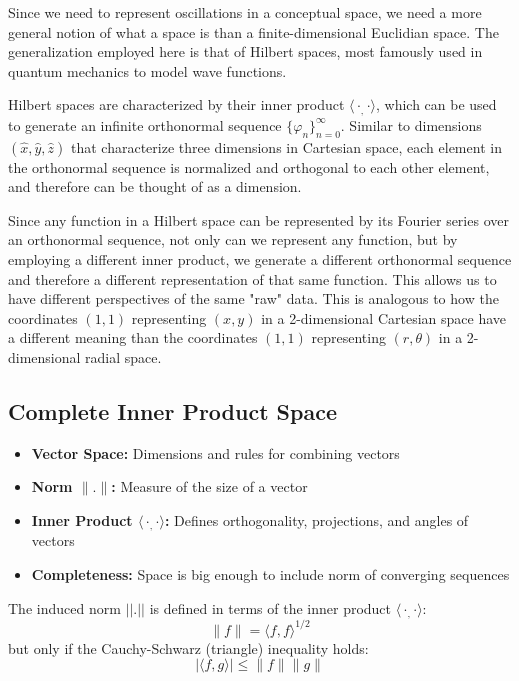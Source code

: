 \documentclass{MastersDoctoralThesis}
\def\innerproduct{\langle\cdot _, \cdot\rangle}
\def\orthseq{\{ \varphi_n \}_{n=0}^\infty}
\begin{document}
Since we need to represent oscillations in a conceptual space, we need a more general notion of what a space is than a finite-dimensional Euclidian space.  The generalization employed here is that of Hilbert spaces, most famously used in quantum mechanics to model wave functions.

Hilbert spaces are characterized by their inner product $\innerproduct$, which can be used to generate an infinite orthonormal sequence $\orthseq$.  Similar to dimensions $(\hat{x}, \hat{y}, \hat{z})$ that characterize three dimensions in Cartesian space, each element in the orthonormal sequence is normalized and orthogonal to each other element, and therefore can be thought of as a dimension. 

Since any function in a Hilbert space can be represented by its Fourier series over an orthonormal sequence, not only can we represent any function, but by employing a different inner product, we generate a different orthonormal sequence and therefore a different representation of that same function. This allows us to have different perspectives of the same "raw" data.  This is analogous to how the coordinates $(1,1)$ representing $(x,y)$ in a 2-dimensional Cartesian space have a different meaning than the coordinates $(1,1)$ representing $(r, \theta)$ in a 2-dimensional radial space.

\subsection{Complete Inner Product Space}
\begin{itemize}
  \item \textbf{Vector Space:} Dimensions and rules for combining vectors
  \item \textbf{Norm $\|.\|$:} Measure of the size of a vector
  \item \textbf{Inner Product $\innerproduct$:} Defines orthogonality, projections, and angles of vectors
  \item \textbf{Completeness:} Space is big enough to include norm of converging sequences
\end{itemize}

The induced norm $||.||$ is defined in terms of the inner product $\innerproduct$:
\begin{equation}
  \|f\| = \langle f, f \rangle^{1/2} 
\end{equation}
but only if the Cauchy-Schwarz (triangle) inequality holds:
\begin{equation}
|\langle f, g \rangle| \leq \|f\|\|g\| 
\end{equation}
\end{document}
